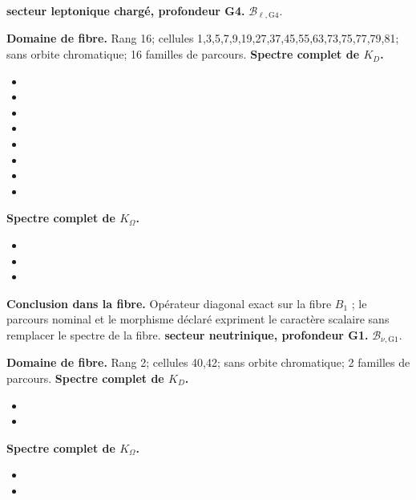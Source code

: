 \medskip
{}
\noindent\textbf{secteur leptonique chargé, profondeur G4.} \(\mathcal B_{\ell,\mathrm{G4}}\).\par
\noindent\textbf{Domaine de fibre.} Rang 16; cellules 1,3,5,7,9,19,27,37,45,55,63,73,75,77,79,81; sans orbite chromatique; 16 familles de parcours.
\noindent\textbf{Spectre complet de \(K_D\).}
\begin{itemize}
\item \texttt{}
\item \texttt{}
\item \texttt{}
\item \texttt{}
\item \texttt{}
\item \texttt{}
\item \texttt{}
\item \texttt{}
\end{itemize}
\noindent\textbf{Spectre complet de \(K_\Omega\).}
\begin{itemize}
\item \texttt{}
\item \texttt{}
\item \texttt{}
\end{itemize}
\noindent\textbf{Conclusion dans la fibre.} Opérateur diagonal exact sur la fibre \(B_1\) ; le parcours nominal et le morphisme déclaré expriment le caractère scalaire sans remplacer le spectre de la fibre.
\medskip
{}
\noindent\textbf{secteur neutrinique, profondeur G1.} \(\mathcal B_{\nu,\mathrm{G1}}\).\par
\noindent\textbf{Domaine de fibre.} Rang 2; cellules 40,42; sans orbite chromatique; 2 familles de parcours.
\noindent\textbf{Spectre complet de \(K_D\).}
\begin{itemize}
\item \texttt{}
\item \texttt{}
\end{itemize}
\noindent\textbf{Spectre complet de \(K_\Omega\).}
\begin{itemize}
\item \texttt{}
\item \texttt{}
\end{itemize}
